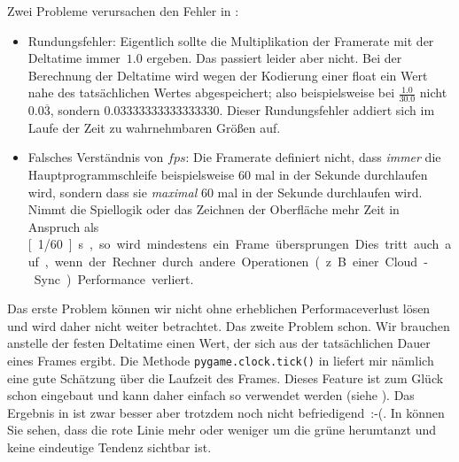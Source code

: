 
Zwei Probleme verursachen den Fehler in :

\begin{itemize}
    \item Rundungsfehler: Eigentlich sollte die Multiplikation der Framerate mit der Deltatime immer~$1.0$ ergeben. Das passiert leider aber nicht. Bei der Berechnung der Deltatime wird wegen der Kodierung einer \gls{float} ein Wert nahe des tatsächlichen Wertes abgespeichert; also beispielsweise bei $\frac{1.0}{30.0}$ nicht $0.0\overline{3}$, sondern $0.03333333333333330$. Dieser Rundungsfehler addiert sich im Laufe der Zeit zu wahrnehmbaren Größen auf.

    \item Falsches Verständnis von $fps$: Die Framerate definiert nicht, dass \emph{immer} die Hauptprogrammschleife beispielsweise 60 mal in der Sekunde durchlaufen wird, sondern dass sie \emph{maximal} 60 mal in der Sekunde durchlaufen wird. Nimmt die Spiellogik oder das Zeichnen der Oberfläche mehr Zeit in Anspruch als \unit[1/60]{s}, so wird mindestens ein Frame übersprungen. Dies tritt auch auf, wenn der Rechner durch andere Operationen (z.B. einer Cloud-Sync) Performance verliert. 
\end{itemize}

Das erste Problem können wir nicht ohne erheblichen Performaceverlust lösen und wird daher nicht weiter betrachtet. Das zweite Problem schon. Wir brauchen anstelle der festen Deltatime einen Wert, der sich aus der tatsächlichen Dauer eines Frames ergibt. Die Methode \texttt{pygame.clock.tick()} in  liefert mir nämlich eine gute Schätzung über die Laufzeit des Frames. Dieses Feature ist zum Glück schon eingebaut und kann daher einfach so verwendet werden (siehe ). Das Ergebnis in  ist zwar besser aber trotzdem noch nicht befriedigend~{:-(}. In  können Sie sehen, dass die rote Linie mehr oder weniger um die grüne herumtanzt und keine eindeutige Tendenz sichtbar ist.


\newpage
{}

